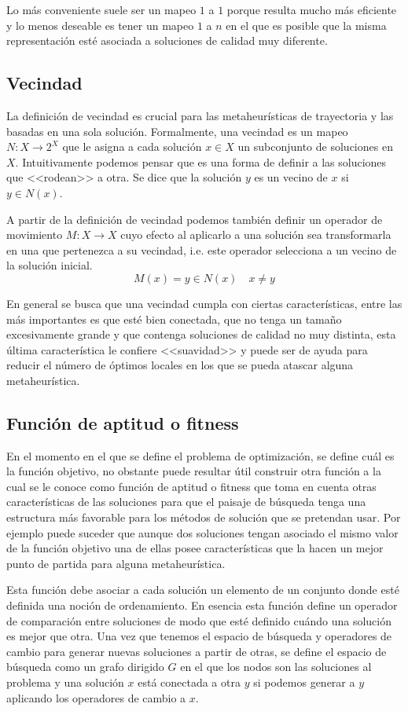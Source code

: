 Lo más conveniente suele ser un mapeo $1$ a $1$ porque resulta mucho más eficiente y lo menos deseable es tener un mapeo $1$ a $n$ en el que es posible que la misma representación esté asociada a soluciones de calidad muy diferente. 

\subsection{Vecindad}
La definición de vecindad es crucial para las metaheurísticas de trayectoria y las basadas en una sola solución.
Formalmente, una vecindad es un mapeo $N:X\rightarrow 2^X$ que le asigna a cada solución $x\in X$ un subconjunto de soluciones en $X$. Intuitivamente podemos pensar que es una forma de definir a las soluciones que <<rodean>> a otra. Se dice que la solución $y$ es un vecino de $x$ si $y\in N(x)$.

A partir de la definición de vecindad podemos también definir un operador de movimiento $M:X\rightarrow X$ cuyo efecto al aplicarlo a una solución sea transformarla en una que pertenezca a su vecindad, i.e. este operador selecciona a un vecino de la solución inicial.  
\[M(x)=y\in N(x)\quad x\neq y\]

En general se busca que una vecindad cumpla con ciertas características, entre las más importantes es que esté bien conectada, que no tenga un tamaño excesivamente grande y que contenga soluciones de calidad no muy distinta, esta última característica le confiere <<suavidad>> y puede ser de ayuda para reducir el número de óptimos locales en los que se pueda atascar alguna metaheurística.

\subsection{Funci\'on de aptitud o fitness}
En el momento en el que se define el problema de optimización, se define cuál es la función objetivo, no obstante puede resultar útil construir otra función a la cual se le conoce como función de aptitud o fitness que toma en cuenta otras características de las soluciones para que el paisaje de búsqueda tenga una estructura más favorable para los métodos de solución que se pretendan usar. Por ejemplo puede suceder que aunque dos soluciones tengan asociado el mismo valor de la función objetivo una de ellas posee características que la hacen un mejor punto de partida para alguna metaheurística.

Esta función debe asociar a cada solución un elemento de un conjunto donde esté definida una noción de ordenamiento. En esencia esta función define un operador de comparación entre soluciones de modo que esté definido cuándo una solución es mejor que otra.
Una vez que tenemos el espacio de búsqueda y operadores de cambio para generar nuevas soluciones a partir de otras, se define el espacio de búsqueda como un grafo dirigido $G$ en el que los nodos son las soluciones al problema y una solución $x$ está conectada a otra $y$ si podemos generar a $y$ aplicando los operadores de cambio a $x$.

